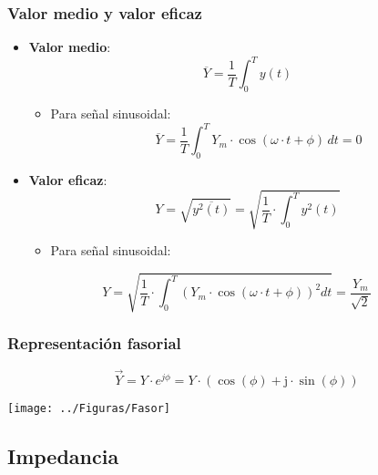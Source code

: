\documentclass[serif, xcolor=dvipsnames]{beamer}
\begin{document}
\begin{frame}
  \frametitle{Valor medio y valor eficaz}
  \begin{itemize}
  \item \textbf{Valor medio}:
    \[
    \overline{Y}=\frac{1}{T}\int_{0}^{T}y(t)
    \]


    \begin{itemize}
    \item Para señal sinusoidal:
      \[
      \overline{Y}=\frac{1}{T}\int_{0}^{T}Y_{m}\cdot\cos(\omega\cdot
      t+\phi)\, dt=0
      \]

    \end{itemize}
  \item \textbf{Valor eficaz}:
    \[
    Y=\sqrt{\overline{y^{2}(t)}}=\sqrt{\frac{1}{T}\cdot\int_{0}^{T}y^{2}(t)}
    \]


    \begin{itemize}
    \item Para señal sinusoidal:
    \end{itemize}
  \end{itemize}
  \[
  Y=\sqrt{\frac{1}{T}\cdot\int_{0}^{T}\left(Y_{m}\cdot\cos(\omega\cdot
      t+\phi)\right)^{2}dt}=\frac{Y_{m}}{\sqrt{2}}
  \]



\end{frame}
\begin{frame}
  \frametitle{Representación fasorial}

\[
\vec{Y}=Y\cdot e^{j\phi}=Y\cdot(\cos(\phi)+\mathrm{j}\cdot\sin(\phi))
\]


\begin{center}
  \texttt{[image: ../Figuras/Fasor]}
  \par\end{center}


\end{frame}
\subsection{Impedancia}
\end{document}
